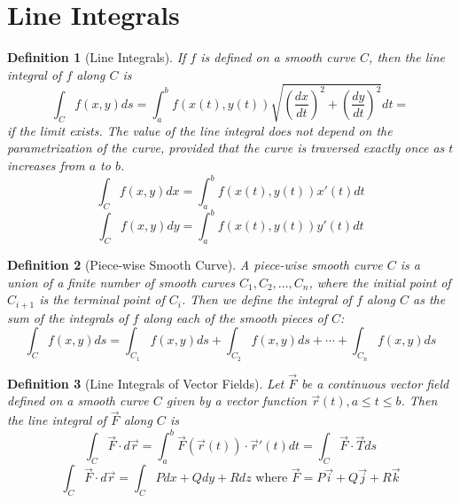 \documentclass[10pt]{report}
\newtheorem{def2}{Definition}[section]
\begin{document}
\section{Line Integrals}
\begin{def2}[Line Integrals]
If $f$ is defined on a smooth curve $C$, then the line integral of $f$ along $C$ is 
$$\int_C f(x,y)ds = \int_a^b f(x(t),y(t))\sqrt{\left(\frac{dx}{dt} \right)^2 + \left( \frac{dy}{dt} \right)^2}dt = $$
if the limit exists. The value of the line integral does not depend on the parametrization of the curve, provided that the curve is traversed exactly once as $t$ increases from $a$ to $b$.
$$\int_C f(x,y)dx = \int_a^b f(x(t),y(t))x'(t)dt$$
$$\int_Cf (x,y)dy = \int_a^b f(x(t),y(t))y'(t)dt$$
\end{def2}
\begin{def2}[Piece-wise Smooth Curve]
A piece-wise smooth curve $C$ is a union of a finite number of smooth curves $C_1,C_2,...,C_n$, where the initial point of $C_{i+1}$ is the terminal point of $C_i$. Then we define the integral of $f$ along $C$ as the sum of the integrals of $f$ along each of the smooth pieces of $C$:
$$\int_C f(x,y)ds = \int_{C_1} f(x,y)ds + \int_{C_2} f(x,y)ds + \cdots + \int_{C_n} f(x,y)ds$$
\end{def2}
\begin{def2}[Line Integrals of Vector Fields]
Let $\vec{F}$ be a continuous vector field defined on a smooth curve $C$ given by a vector function $\vec{r}(t),a\leq t\leq b$. Then the line integral of $\vec{F}$ along $C$ is
$$\int_C \vec{F}\cdot d\vec{r} = \int_a^b \vec{F}(\vec{r}(t))\cdot\vec{r}'(t)dt = \int_C\vec{F}\cdot\vec{T}ds$$
$$\int_C \vec{F}\cdot d\vec{r} = \int_C Pdx + Qdy + Rdz \text{  where  } \vec{F} = P\vec{i} + Q\vec{j} + R\vec{k}$$
\end{def2}
\end{document}
